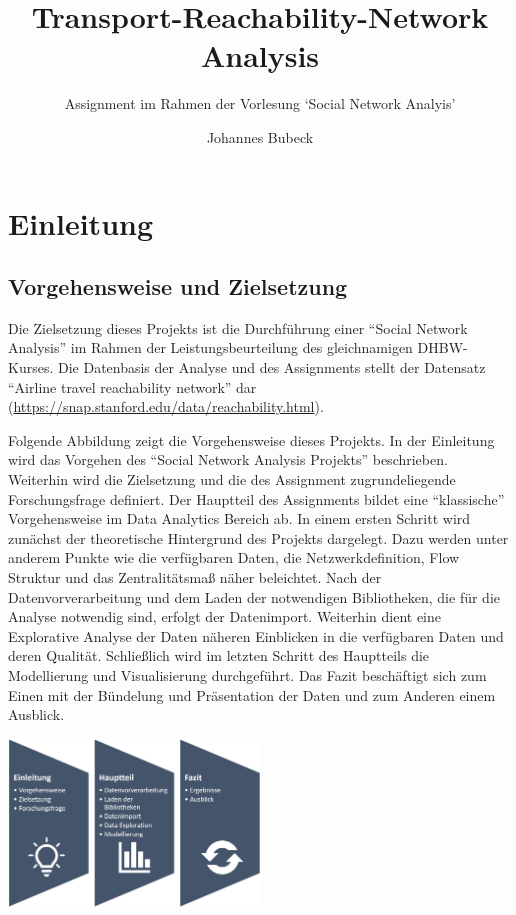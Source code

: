 \documentclass[]{article}
\title{Transport-Reachability-Network Analysis}
\subtitle{Assignment im Rahmen der Vorlesung `Social Network Analyis'}
\author{Johannes Bubeck}
\date{}
\begin{document}
\maketitle

{
\setcounter{tocdepth}{2}
\tableofcontents
}
\hypertarget{einleitung}{%
\section{Einleitung}\label{einleitung}}

\hypertarget{vorgehensweise-und-zielsetzung}{%
\subsection{Vorgehensweise und
Zielsetzung}\label{vorgehensweise-und-zielsetzung}}

Die Zielsetzung dieses Projekts ist die Durchführung einer ``Social
Network Analysis'' im Rahmen der Leistungsbeurteilung des gleichnamigen
DHBW-Kurses. Die Datenbasis der Analyse und des Assignments stellt der
Datensatz ``Airline travel reachability network'' dar
(\url{https://snap.stanford.edu/data/reachability.html}).

Folgende Abbildung zeigt die Vorgehensweise dieses Projekts. In der
Einleitung wird das Vorgehen des ``Social Network Analysis Projekts''
beschrieben. Weiterhin wird die Zielsetzung und die des Assignment
zugrundeliegende Forschungsfrage definiert. Der Hauptteil des
Assignments bildet eine ``klassische'' Vorgehensweise im Data Analytics
Bereich ab. In einem ersten Schritt wird zunächst der theoretische
Hintergrund des Projekts dargelegt. Dazu werden unter anderem Punkte wie
die verfügbaren Daten, die Netzwerkdefinition, Flow Struktur und das
Zentralitätsmaß näher beleichtet. Nach der Datenvorverarbeitung und dem
Laden der notwendigen Bibliotheken, die für die Analyse notwendig sind,
erfolgt der Datenimport. Weiterhin dient eine Explorative Analyse der
Daten näheren Einblicken in die verfügbaren Daten und deren Qualität.
Schließlich wird im letzten Schritt des Hauptteils die Modellierung und
Visualisierung durchgeführt. Das Fazit beschäftigt sich zum Einen mit
der Bündelung und Präsentation der Daten und zum Anderen einem Ausblick.

\includegraphics[width=0.5\textwidth,height=\textheight]{Data/Vorgehensweise.png}
\end{document}

